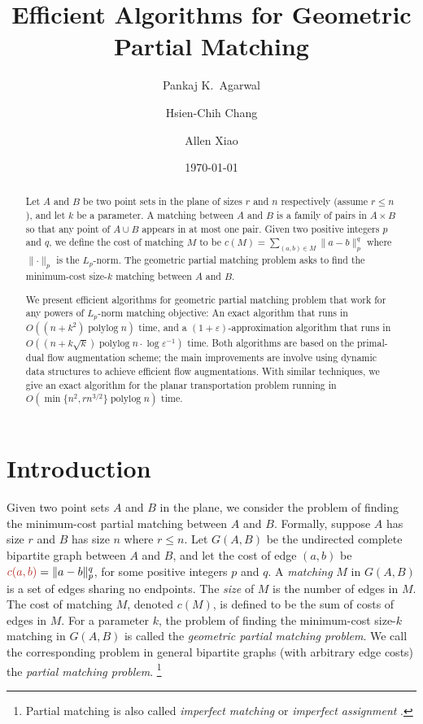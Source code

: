 \documentclass[a4paper,UKenglish]{socg-lipics-v2019}
\title{Efficient Algorithms for Geometric Partial Matching}
\author{Pankaj K.\ Agarwal}{Duke University, Durham, United~States}{pankaj@cs.duke.edu}{}{}
\author{Hsien-Chih Chang}{Duke University, Durham, United~States}{hsienchih.chang@duke.edu}{}{}
\author{Allen Xiao}{Duke University, Durham, United~States}{axiao@cs.duke.edu}{}{}
\date{\today}
\def\polylog{\mathop{\mathrm{polylog}}}
\def\eps{\varepsilon}
\def\norm#1{\mathopen\| #1 \mathclose\|}	%
\def\cost{c}
\theoremstyle{plain}
\numberwithin{figure}{section}
\def\EMPH#1{\textcolor{BrickRed}{{\emph{#1}}}}
\begin{document}
\maketitle

\begin{abstract}
Let $A$ and $B$ be two point sets in the plane of sizes $r$ and $n$ respectively (assume $r \leq n$), and let $k$ be a parameter.
A matching between $A$ and $B$ is a family of pairs in $A \times B$ so that any point of $A \cup B$ appears in at most one pair.
Given two positive integers $p$ and $q$, we define the cost of matching $M$ to be $\cost(M) = \sum_{(a, b) \in M}\norm{a-b}_p^q$ where $\norm{\cdot}_p$ is the $L_p$-norm.
The geometric partial matching problem asks to find the minimum-cost size-$k$ matching between $A$ and $B$.

We present efficient algorithms for geometric partial matching problem that work for any powers of $L_p$-norm matching objective:
An exact algorithm that runs in $O((n + k^2)\polylog n)$ time, and a $(1 + \eps)$-approximation algorithm that runs in $O((n + k\sqrt{k})\polylog n \cdot \log\eps^{-1})$ time.
Both algorithms are based on the primal-dual flow augmentation scheme; the main improvements are involve using dynamic data structures to achieve efficient flow augmentations.
With similar techniques, we give an exact algorithm for the planar transportation problem running in $O(\min\{n^2, rn^{3/2}\}\polylog n)$ time.
\end{abstract}


\section{Introduction}

Given two point sets $A$ and $B$ in the plane, we consider the problem of finding
the minimum-cost partial matching between $A$ and $B$.
Formally, suppose $A$ has size $r$ and $B$ has size $n$ where $r \leq n$.
Let $G(A, B)$ be the undirected complete bipartite graph between
$A$ and $B$, and let the cost of edge $(a, b)$ be
$\EMPH{$c(a, b)$} = \norm{a-b}_p^q$, for some positive integers $p$ and $q$.
A \EMPH{matching} $M$ in $G(A, B)$ is a set of edges sharing no endpoints.
The \EMPH{size} of $M$ is the number of edges in $M$.
The cost of matching $M$, denoted \EMPH{$\cost(M)$}, is defined to be the sum of costs of edges in $M$.
For a parameter $k$, the problem of finding the minimum-cost
size-$k$ matching in $G(A, B)$ is called the \EMPH{geometric partial matching problem}.
We call the corresponding problem in general bipartite graphs (with arbitrary
edge costs) the \EMPH{partial matching problem}.%
\footnote{Partial matching is also called \EMPH{imperfect matching} or \EMPH{imperfect assignment} \cite{RT12,GHKT17}.}
\end{document}
